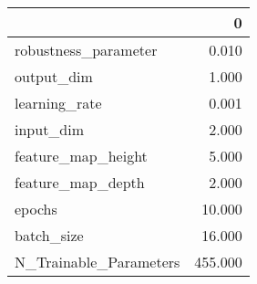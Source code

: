 \begin{tabular}{lr}
\toprule
{} &        0 \\
\midrule
robustness\_parameter   &    0.010 \\
output\_dim             &    1.000 \\
learning\_rate          &    0.001 \\
input\_dim              &    2.000 \\
feature\_map\_height     &    5.000 \\
feature\_map\_depth      &    2.000 \\
epochs                 &   10.000 \\
batch\_size             &   16.000 \\
N\_Trainable\_Parameters &  455.000 \\
\bottomrule
\end{tabular}
